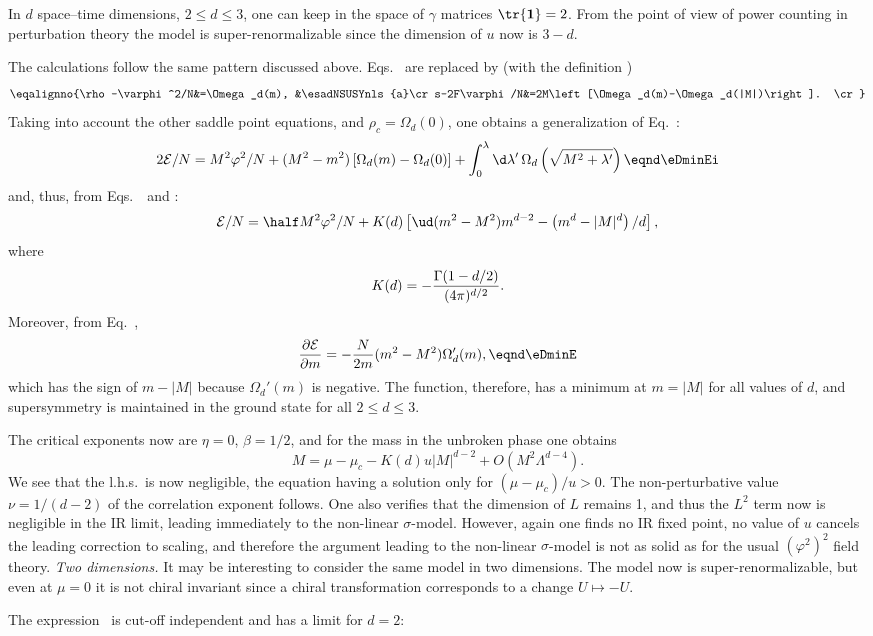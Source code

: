In $d$ space--time dimensions, $2\leq d \leq 3$, one can keep in the space of $\gamma $ matrices $\tr{\bf 1}=2$. From the point of view of power counting in perturbation theory the model is super-renormalizable since the dimension of $u$ now is $3-d$.\par
The calculations follow the same pattern discussed above.
Eqs.~\eSUSYii{} are replaced by (with the definition \etadepole)
\eqna\esadNSUSYnls
$$\eqalignno{\rho-\varphi^2/N&=\Omega _d(m), &\esadNSUSYnls{a}\cr
s-2F\varphi/N&=2M\left[\Omega _d(m)-\Omega _d(|M|)\right]. \cr}$$
Taking into account the other saddle point equations, and $\rho_c=\Omega _d(0)$,
one obtains a generalization of Eq.~\eSUSYground:
$$2 {\cal E}/N =  M^2\varphi^2/N+(M^2-m^2)\left[ \Omega _d(m)-\Omega _d(0)\right] +\int_0^\lambda \d\lambda ' \,
 \Omega _d\left(\sqrt{M^2+\lambda '}\right)  \eqnd \eDminEi $$
and, thus, from Eqs.~\etadepolii\ and :
$$ {\cal E}/N =\half M^2\varphi^2/N +K(d)\left[ \ud (m^2-M^2)m^{d-2}
-\left(m^d-|M|^{d }\right)/d\right],$$
 where
$$K(d)= -{ \Gamma(1-d/2)\over (4\pi)^{d/2}}.$$
Moreover, from Eq.~\eDminEi,
$${\partial {\cal E}\over\partial m }=- {N\over 2m}  (m^2-M^2)
 \Omega _d'(m),\eqnd \eDminE $$
which has the sign of $m-|M|$ because $\Omega _d'(m)$ is negative. The function, therefore, has a minimum  at $m=|M|$ for all values of $d$, and supersymmetry is maintained in the ground state for all $2\leq d \leq3$.\par
The critical exponents now are $\eta =0$, $\beta=1/2$, and for the mass in the unbroken phase one obtains
$$M=\mu -\mu _c-K(d)u |M|^{d-2}+O(M^2\Lambda ^{d-4}).$$
We see that the l.h.s.~is now negligible, the equation having a solution only for $(\mu -\mu _c)/u>0$. The non-perturbative value  $\nu =1/(d-2)$ of the correlation exponent follows.
One also verifies that the dimension of $L$ remains 1, and thus the $L^2$ term now is negligible in the IR limit, leading immediately to the non-linear $\sigma $-model. However, again one finds no IR fixed point, no value of $u$ cancels
the leading correction to scaling, and therefore the argument leading to the non-linear $\sigma $-model is not as solid as for the usual $(\varphi^2)^2$ field theory.
\medskip
{\it Two dimensions.}
It may be interesting to consider the same model in two
dimensions. The model now is super-renormalizable, but even at $\mu=0$ it is
not chiral invariant since a chiral transformation corresponds to a change
$U\mapsto -U$.\par
The expression \eDminE\  is cut-off independent and has a limit for $d=2$:
